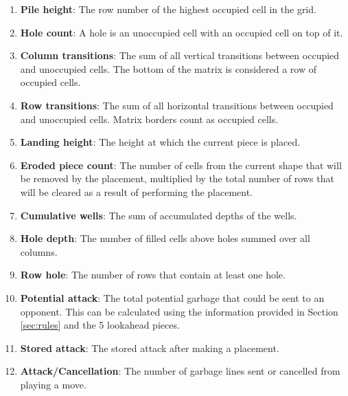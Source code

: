\documentclass[a4paper, 12pt]{extreport}
\begin{document}
				\begin{enumerate}
					\item \textbf{Pile height}: The row number of the highest occupied cell in the grid.
					\item \textbf{Hole count}: A hole is an unoccupied cell with an occupied cell on top of it.
					\item \textbf{Column transitions}: The sum of all vertical transitions between occupied and unoccupied cells. The bottom of the matrix is considered a row of occupied cells.
					\item \textbf{Row transitions}: The sum of all horizontal transitions between occupied and unoccupied cells. Matrix borders count as occupied cells.
					\item \textbf{Landing height}: The height at which the current piece is placed.
					\item \textbf{Eroded piece count}: The number of cells from the current shape that will be removed by the placement, multiplied by the total number of rows that will be cleared as a result of performing the placement.
					\item \textbf{Cumulative wells}: The sum of accumulated depths of the wells.
					\item \textbf{Hole depth}: The number of filled cells above holes summed over all columns.
					\item \textbf{Row hole}: The number of rows that contain at least one hole.
					\item \textbf{Potential attack}: The total potential garbage that could be sent to an opponent. This can be calculated using the information provided in Section \ref{sec:rules} and the 5 lookahead pieces.
					\item \textbf{Stored attack}: The stored attack after making a placement.
					\item \textbf{Attack/Cancellation}: The number of garbage lines sent or cancelled from playing a move.
				\end{enumerate}
				
%			
%				
				
\end{document}
